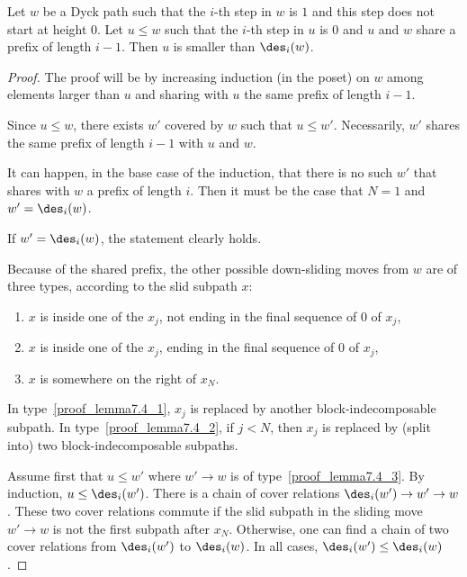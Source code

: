 \begin{lemma}
  \label{sub_force_0}
  Let $w$ be a Dyck path such that the $i$-th step in $w$ is $1$ and
  this step does not start at height $0$. Let $u \leq w$ such that the
  $i$-th step in $u$ is $0$ and $u$ and $w$ share a prefix
  of length $i - 1$. Then $u$ is smaller than $\des_i(w)$.
\end{lemma}
\begin{proof}
  The proof will be by increasing induction (in the poset) on $w$
  among elements larger than $u$ and sharing with $u$ the same prefix
  of length $i - 1$.

  Since $u \leq w$, there exists $w'$ covered by $w$ such that
  $u \leq w'$. Necessarily, $w'$ shares the same prefix of length
  $i-1$ with $u$ and $w$.

  It can happen, in the base case of the induction, that there is no
  such $w'$ that shares with $w$ a prefix of length $i$. Then it must
  be the case that $N=1$ and $w' = \des_i(w)$.

  If $w' = \des_i(w)$, the statement clearly holds.

  Because of the shared prefix, the other possible down-sliding moves
  from $w$ are of three types, according to the slid subpath $x$:
  \begin{enumerate}%
  \item\label{proof_lemma7.4_1} $x$ is inside one of the $x_j$, not ending in the final
    sequence of $0$ of $x_j$,
  \item\label{proof_lemma7.4_2} $x$ is inside one of the $x_j$, ending in the final
    sequence of $0$ of $x_j$,
  \item\label{proof_lemma7.4_3} $x$ is somewhere on the right of $x_N$.
  \end{enumerate}

  In type~\eqref{proof_lemma7.4_1}, $x_j$ is replaced by another block-indecomposable
  subpath. In type~\eqref{proof_lemma7.4_2}, if $j < N$, then $x_j$ is replaced by (split
  into) two block-indecomposable subpaths.

  Assume first that $u \leq w'$ where $w' \to w$ is of type~\eqref{proof_lemma7.4_3}. By
  induction, $u \leq \des_i(w')$. There is a chain of cover relations
  $\des_i(w') \to w' \to w$. These two cover relations commute if the slid
  subpath in the sliding move $w' \to w$ is not the first subpath after
  $x_N$. Otherwise, one can find a chain of two cover relations from
  $\des_i(w')$ to $\des_i(w)$. In all cases,
  $\des_i(w') \leq \des_i(w)$.


\end{proof}
